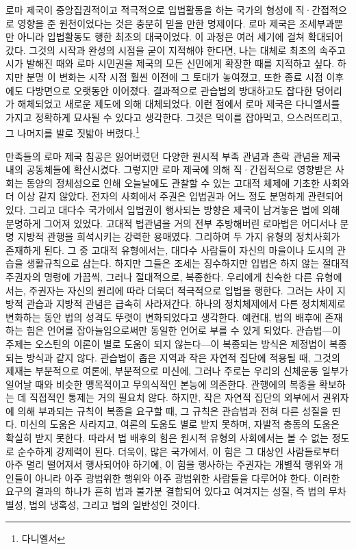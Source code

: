 로마 제국이 중앙집권적이고 적극적으로 입법활동을 하는 국가의 형성에
직·간접적으로 영향을 준 원천이었다는 것은 충분히 믿을 만한 명제이다.
로마 제국은 조세부과뿐만 아니라 입법활동도 행한 최초의 대국이었다.
이 과정은 여러 세기에 걸쳐 확대되어갔다.
그것의 시작과 완성의 시점을 굳이 지적해야 한다면,
나는 대체로
최초의 속주고시가 발해진 때와
로마 시민권을 제국의 모든 신민에게 확장한 때를 지적하고 싶다.
하지만 분명 이 변화는 시작 시점 훨씬 이전에 그 토대가 놓여졌고,
또한 종료 시점 이후에도 다방면으로 오랫동안 이어졌다.
결과적으로
관습법의 방대하고도 잡다한 덩어리가 해체되었고
새로운 제도에 의해 대체되었다.
이런 점에서 로마 제국은 다니엘서를 가지고 정확하게 묘사될 수 있다고 생각한다.
그것은
먹이를 잡아먹고, 으스러뜨리고, 그 나머지를 발로 짓밟아 버렸다.\footnote{%
  다니엘서  }

만족들의 로마 제국 침공은
잃어버렸던 다양한 원시적 부족 관념과 촌락 관념을
제국 내의 공동체들에 확산시켰다.
그렇지만
로마 제국에 의해 직·간접적으로 영향받은 사회는
동양의 정체성으로 인해 오늘날에도 관찰할 수 있는
고대적 체제에 기초한 사회와 더 이상 같지 않았다.
전자의 사회에서 주권은 입법권과 어느 정도 분명하게 관련되어 있다.
그리고
대다수 국가에서 입법권이 행사되는 방향은 제국이 남겨놓은
법에 의해 분명하게 그어져 있었다.
고대적 법관념을 거의 전부 추방해버린 로마법은
어디서나 분명 지방적 관행을 희석시키는 강력한 용매였다.
그리하여 두 가지 유형의 정치사회가 존재하게 된다.
그 중 고대적 유형에서는,
대다수 사람들이 자신의 마을이나 도시의 관습을 생활규칙으로 삼는다.
하지만 그들은 조세는 징수하지만 입법은 하지 않는 절대적 주권자의 명령에
가끔씩, 그러나 절대적으로, 복종한다.
우리에게 친숙한 다른 유형에서는,
주권자는 자신의 원리에 따라 더욱더 적극적으로 입법을 행한다.
그러는 사이 지방적 관습과 지방적 관념은 급속히 사라져간다.
하나의 정치체제에서 다른 정치체제로 변화하는 동안
법의 성격도 뚜렷이 변화되었다고 생각한다.
예컨대, 법의 배후에 존재하는 힘은
언어를 잡아늘임으로써만 동일한 언어로 부를 수 있게 되었다.
관습법---이 주제는 오스틴의 이론이 별로 도움이 되지 않는다---이 복종되는
방식은 제정법이 복종되는 방식과 같지 않다.
관습법이 좁은 지역과 작은 자연적 집단에 적용될 때,
그것의 제재는 부분적으로 여론에, 부분적으로 미신에,
그러나 주로는 우리의 신체운동 일부가 일어날 때와 비슷한 맹목적이고
무의식적인 본능에 의존한다.
관행에의 복종을 확보하는 데 직접적인 통제는 거의 필요치 않다.
하지만, 작은 자연적 집단의 외부에서 권위자에 의해 부과되는 규칙이
복종을 요구할 때, 그 규칙은 관습법과 전혀 다른 성질을 띤다.
미신의 도움은 사라지고, 여론의 도움도 별로 받지 못하며,
자발적 충동의 도움은 확실히 받지 못한다.
따라서 법 배후의 힘은 원시적 유형의 사회에서는 볼 수 없는 정도로
순수하게 강제력이 된다.
더욱이, 많은 국가에서,
이 힘은 그 대상인 사람들로부터 아주 멀리 떨어져서 행사되어야 하기에,
이 힘을 행사하는 주권자는
개별적 행위와 개인들이 아니라
아주 광범위한 행위와 아주 광범위한 사람들을 다루어야 한다.
이러한 요구의 결과의 하나가
흔히 법과 불가분 결합되어 있다고 여겨지는 성질,
즉 법의 무차별성, 법의 냉혹성, 그리고 법의 일반성인 것이다.

